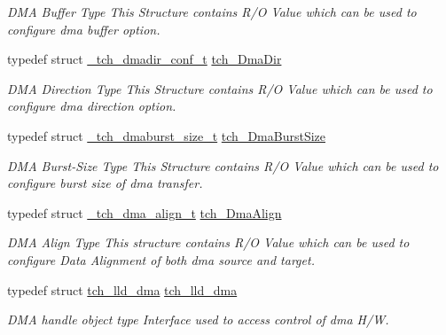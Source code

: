 \begin{DoxyCompactItemize}
\begin{DoxyCompactList}\small\item\em D\+M\+A Buffer Type This Structure contains R/\+O Value which can be used to configure dma buffer option. \end{DoxyCompactList}\item 
\hypertarget{group___d_m_a___h_a_l_ga5dcce03c536a61c6019db585cce6f6fd}{typedef struct \hyperlink{struct__tch__dmadir__conf__t}{\+\_\+tch\+\_\+dmadir\+\_\+conf\+\_\+t} \hyperlink{group___d_m_a___h_a_l_ga5dcce03c536a61c6019db585cce6f6fd}{tch\+\_\+\+Dma\+Dir}}\label{group___d_m_a___h_a_l_ga5dcce03c536a61c6019db585cce6f6fd}

\begin{DoxyCompactList}\small\item\em D\+M\+A Direction Type This Structure contains R/\+O Value which can be used to configure dma direction option. \end{DoxyCompactList}\item 
\hypertarget{group___d_m_a___h_a_l_ga0be56c05114a407307c515d742118e29}{typedef struct \hyperlink{struct__tch__dmaburst__size__t}{\+\_\+tch\+\_\+dmaburst\+\_\+size\+\_\+t} \hyperlink{group___d_m_a___h_a_l_ga0be56c05114a407307c515d742118e29}{tch\+\_\+\+Dma\+Burst\+Size}}\label{group___d_m_a___h_a_l_ga0be56c05114a407307c515d742118e29}

\begin{DoxyCompactList}\small\item\em D\+M\+A Burst-\/\+Size Type This Structure contains R/\+O Value which can be used to configure burst size of dma transfer. \end{DoxyCompactList}\item 
\hypertarget{group___d_m_a___h_a_l_ga3869e0f1a0535255090c722e42a1c3db}{typedef struct \hyperlink{struct__tch__dma__align__t}{\+\_\+tch\+\_\+dma\+\_\+align\+\_\+t} \hyperlink{group___d_m_a___h_a_l_ga3869e0f1a0535255090c722e42a1c3db}{tch\+\_\+\+Dma\+Align}}\label{group___d_m_a___h_a_l_ga3869e0f1a0535255090c722e42a1c3db}

\begin{DoxyCompactList}\small\item\em D\+M\+A Align Type This structure contains R/\+O Value which can be used to configure Data Alignment of both dma source and target. \end{DoxyCompactList}\item 
typedef struct \hyperlink{structtch__lld__dma}{tch\+\_\+lld\+\_\+dma} \hyperlink{group___d_m_a___h_a_l_ga4f23199bd140de283076126336d999e4}{tch\+\_\+lld\+\_\+dma}
\begin{DoxyCompactList}\small\item\em D\+M\+A handle object type Interface used to access control of dma H/\+W. \end{DoxyCompactList}\end{DoxyCompactItemize}


